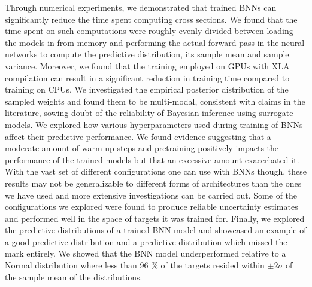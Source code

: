 Through numerical experiments, we demonstrated that trained BNNs can significantly reduce the time spent computing cross sections. We found that the time spent on such computations were roughly evenly divided between loading the models in from memory and performing the actual forward pass in the neural networks to compute the predictive distribution, its sample mean and sample variance. Moreover, we found that the training employed on GPUs with XLA compilation can result in a significant reduction in training time compared to training on CPUs.
We investigated the empirical posterior distribution of the sampled weights and found them to be multi-modal, consistent with claims in the literature, sowing doubt of the reliability of Bayesian inference using surrogate models. We explored how various hyperparameters used during training of BNNs affect their predictive performance. We found evidence suggesting that a moderate amount of warm-up steps and pretraining positively impacts the performance of the trained models but that an excessive amount exacerbated it. With the vast set of different configurations one can use with BNNs though, these results may not be generalizable to different forms of architectures than the ones we have used and more extensive investigations can be carried out. Some of the configurations we explored were found to produce reliable uncertainty estimates and performed well in the space of targets it was trained for. Finally, we explored the predictive distributions of a trained BNN model and showcased an example of a good predictive distribution and a predictive distribution which missed the mark entirely. We showed that the BNN model underperformed relative to a Normal distribution where less than 96 \% of the targets resided within $\pm 2\sigma$ of the sample mean of the distributions. 

